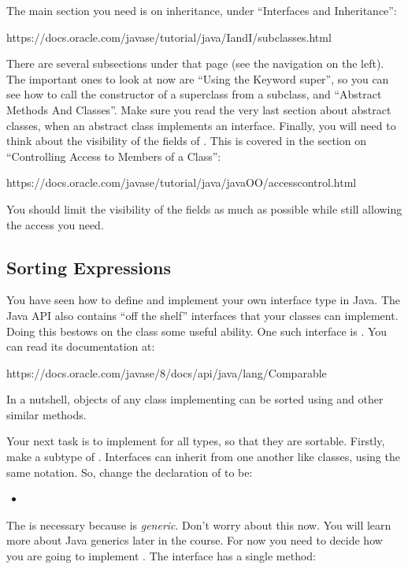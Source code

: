 \documentclass[11pt,a4paper]{article}
\begin{document}
The main section you need is on inheritance, under 
``Interfaces and Inheritance'':

https://docs.oracle.com/javase/tutorial/java/IandI/subclasses.html

There are several subsections under that page (see the navigation on the left).
The important ones to look at now are ``Using the Keyword super'',
so you can see how to call the constructor of a superclass from a subclass,
and ``Abstract Methods And Classes''.
Make sure you read the very last section about abstract classes, 
when an abstract class implements an interface.
Finally, you will need to think about the visibility of the fields
of .
This is covered in the section on ``Controlling Access to Members of a Class'':

https://docs.oracle.com/javase/tutorial/java/javaOO/accesscontrol.html

You should limit the visibility of the fields as much as possible
while still allowing the access you need.


\subsection{Sorting Expressions}

You have seen how to define and implement your own interface type in Java.
The Java API also contains ``off the shelf'' interfaces that your classes
can implement. 
Doing this bestows on the class some useful ability.
One such interface is .
You can read its documentation at:

https://docs.oracle.com/javase/8/docs/api/java/lang/Comparable

In a nutshell, objects of any class implementing   
can be sorted using  and other similar methods.

Your next task is to implement  for all 
types, so that they are sortable.
Firstly, make  a subtype of .
Interfaces can inherit from one another like classes,
using the same notation.
So, change the declaration of  to be:

\begin{itemize}
  \item {}
\end{itemize}

The  is necessary because  is
\emph{generic}.
Don't worry about this now.
You will learn more about Java generics later in the course.
For now you need to decide how you are going to implement
.
The interface has a single method: 
\end{document}
